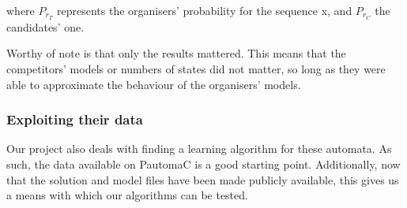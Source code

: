 where $P_{r_{T}}$ represents the organisers' probability for the
sequence x, and $P_{r_{C}}$ the candidates' one.

Worthy of note is that only the results mattered. This means that
the competitors\textquoteright{} models or numbers of states did not
matter, so long as they were able to approximate the behaviour of
the organisers\textquoteright{} models.


\subsubsection{Exploiting their data}

Our project also deals with finding a learning algorithm for these
automata. As such, the data available on PautomaC is a good starting
point. Additionally, now that the solution and model files have been
made publicly available, this gives us a means with which our algorithms
can be tested.